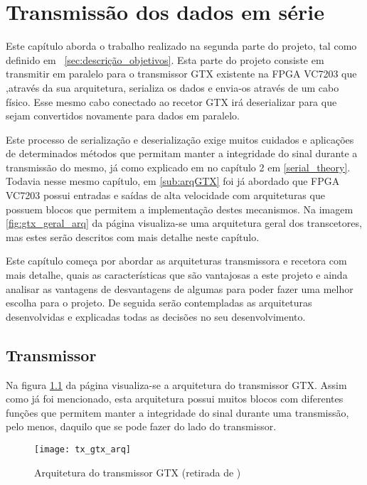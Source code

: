 
\chapter{Transmissão dos dados em série}\label{chap:chap4}

Este capítulo aborda o trabalho realizado na segunda parte do projeto, tal como definido em ~\ref{sec:descrição_objetivos}. Esta parte do projeto consiste em transmitir em paralelo para o transmissor GTX existente na FPGA VC7203 que ,através da sua arquitetura, serializa os dados e envia-os através de um cabo físico. Esse mesmo cabo conectado ao recetor GTX irá deserializar para que sejam convertidos novamente para dados em paralelo.

Este processo de serialização e deserialização exige muitos cuidados e aplicações de determinados métodos que permitam manter a integridade do sinal durante a transmissão do mesmo, já como explicado em no capítulo 2 em \ref{serial_theory}. Todavia nesse mesmo capítulo, em \ref{sub:arqGTX} foi já abordado que FPGA VC7203 possui entradas e saídas de alta velocidade com arquiteturas que possuem blocos que permitem a implementação destes mecanismos. Na imagem \ref{fig:gtx_geral_arq} da página \pageref{fig:gtx_geral_arq} visualiza-se uma arquitetura geral dos transcetores, mas estes serão descritos com mais detalhe neste capítulo.

Este capítulo começa por abordar as arquiteturas transmissora e recetora com mais detalhe, quais as características que são vantajosas a este projeto e ainda analisar as vantagens de desvantagens de algumas para poder fazer uma melhor escolha para o projeto. De seguida serão contempladas as arquiteturas desenvolvidas e explicadas todas as decisões no seu desenvolvimento.

\section{Transmissor} \label{sec:tx_gtx}

Na figura \ref{fig:gtx_tx_arq} da página \pageref{fig:gtx_tx_arq} visualiza-se a arquitetura do transmissor GTX. Assim como já foi mencionado, esta arquitetura possui muitos blocos com diferentes funções que permitem manter a integridade do sinal durante uma transmissão, pelo menos, daquilo que se pode fazer do lado do transmissor.
\begin{figure}[h!]
	\begin{center}
		\leavevmode
		\texttt{[image: tx\_gtx\_arq]}
		\caption[Arquitetura do transmissor GTX]{Arquitetura do transmissor GTX (retirada de \cite{R011})}
		\label{fig:gtx_tx_arq}
	\end{center}
\end{figure}

